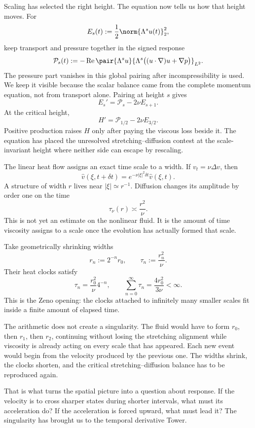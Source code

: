 
Scaling has selected the right height.  The equation now tells us how that
height moves.  For
\[
  E_s(t):=\frac12\norm{\Lambda^su(t)}_2^2,
\]
keep transport and pressure together in the signed response
\[
  \mathcal P_s(t)
  :=-
  \operatorname{Re}
  \pair{\Lambda^su}
  {\Lambda^s\bigl((u\cdot\nabla)u+\nabla p\bigr)}_{L^2}.
\]
The pressure part vanishes in this global pairing after incompressibility is
used.  We keep it visible because the scalar balance came from the complete
momentum equation, not from transport alone.  Pairing at height \(s\) gives
\begin{equation}\label{eq:BodySpatialEnergyBalanceIntro}
  E_s'=\mathcal P_s-2\nu E_{s+1}.
\end{equation}
At the critical height,
\begin{equation}\label{eq:BodyCriticalHeightBalanceIntro}
  H'=\mathcal P_{1/2}-2\nu E_{3/2}.
\end{equation}
Positive production raises \(H\) only after paying the viscous loss beside
it.  The equation has placed the unresolved stretching--diffusion contest at
the scale-invariant height where neither side can escape by rescaling.


The linear heat flow assigns an exact time scale to a width.  If
\(v_t=\nu\Delta v\), then
\[
  \widehat v(\xi,t+\delta t)
  =e^{-\nu|\xi|^2\delta t}\widehat v(\xi,t).
\]
A structure of width \(r\) lives near \(|\xi|\simeq r^{-1}\).  Diffusion
changes its amplitude by order one on the time
\begin{equation}\label{eq:BodyHeatComparisonTime}
  \tau_\nu(r)\asymp\frac{r^2}{\nu}.
\end{equation}
This is not yet an estimate on the nonlinear fluid.  It is the amount of time
viscosity assigns to a scale once the evolution has actually formed that
scale.

Take geometrically shrinking widths
\[
  r_n:=2^{-n}r_0,
  \qquad
  \tau_n:=\frac{r_n^2}{\nu}.
\]
Their heat clocks satisfy
\begin{equation}\label{eq:BodyZenoHeatClock}
  \tau_n=\frac{r_0^2}{\nu}4^{-n},
  \qquad
  \sum_{n=0}^{\infty}\tau_n
  =\frac{4r_0^2}{3\nu}<\infty.
\end{equation}
This is the Zeno opening: the clocks attached to infinitely many smaller
scales fit inside a finite amount of elapsed time.

The arithmetic does not create a singularity.  The fluid would have to form
\(r_0\), then \(r_1\), then \(r_2\), continuing without losing the
stretching alignment while viscosity is already acting on every scale that
has appeared.  Each new event would begin from the velocity produced by the
previous one.  The widths shrink, the clocks shorten, and the critical
stretching--diffusion balance has to be reproduced again.

That is what turns the spatial picture into a question about response.  If the
velocity is to cross sharper states during shorter intervals, what must its
acceleration do?  If the acceleration is forced upward, what must lead it?
The singularity has brought us to the temporal derivative Tower.

